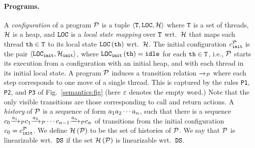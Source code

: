 \paragraph{Programs.}
A {\it configuration} of a program
${\mathcal P}$ is a tuple
$\left\langle{\tt T},{\tt LOC},{\mathcal H}\right\rangle$ where
${\tt T}$ is a set of threads,
${\mathcal H}$ is a heap, and
${\tt LOC}$ is a {\it local state mapping}
over ${\tt T}$ wrt.\ ${\mathcal H}$
that maps each thread ${\tt th}\in{\tt T}$ to its
local state ${\tt LOC}\left({\tt th}\right)$ wrt.\ ${\mathcal H}$.
%
%
The initial configuration
$c_{\tt init}^{{\mathcal P}}$ 
is the pair
$\left\langle{\tt LOC}_{\tt init},{\mathcal H}_{\tt init}\right\rangle$,
where
${\tt LOC}_{\tt init}\left({\tt th}\right)={\tt idle}$ for each
${\tt th}\in{\tt T}$,
i.e.,
${\mathcal P}$ starts its execution from a configuration with an initial
heap, and with each thread in its initial local state.
%
A program ${\mathcal P}$ induces a transition relation
${\xrightarrow{}{}}_{\!\!{\mathcal P}}$ where each step corresponds
to one move of a single thread.
%
This is captured by the rules 
{\tt P1}, {\tt P2}, and {\tt P3} of
Fig.~\ref{semantics:fig} 
(here $\varepsilon$ denotes the empty word.)
%
Note that the only visible transitions are those
corresponding to call and return actions.
%
A {\it history} of ${\mathcal P}$ is a sequence of form
$a_1a_2\cdots a_n$, such that there is a
sequence
$
c_0{\xrightarrow{a_1}{}}_{\!\!{\mathcal P}}
c_1{\xrightarrow{a_2}{}}_{\!\!{\mathcal P}}
\cdots
c_{n-1}{\xrightarrow{a_n}{}}_{\!\!{\mathcal P}}c_n
$
of transitions from the initial configuration
$c_0=c_{\tt init}^{{\mathcal P}}$.
%
We define ${\mathcal H}\left({\mathcal P}\right)$ to be the set of histories of ${\mathcal P}$.
%
We say that ${\mathcal P}$ is linearizable wrt.\ 
${\tt DS}$ if the set 
${\mathcal H}\left({\mathcal P}\right)$ is linearizable wrt.\ ${\tt DS}$.

